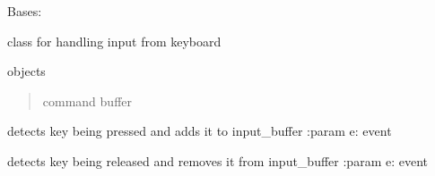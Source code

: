 \documentclass[letterpaper,10pt,english]{sphinxmanual}
\begin{document}
\begin{fulllineitems}
\label{\detokenize{InputHandler:InputHandler.InputHandler}}
\pysigstartsignatures
{}
\pysigstopsignatures
\sphinxAtStartPar
Bases: 

\sphinxAtStartPar
class for handling input from keyboard

\begin{fulllineitems}
\label{\detokenize{InputHandler:InputHandler.InputHandler.handle_input}}
\pysigstartsignatures
{}
\pysigstopsignatures\begin{description}
\sphinxAtStartPar
objects

\end{description}
\begin{quote}\begin{description}
\sphinxAtStartPar
command buffer

\end{description}\end{quote}

\end{fulllineitems}


\begin{fulllineitems}
\label{\detokenize{InputHandler:InputHandler.InputHandler.keydown}}
\pysigstartsignatures
{}
\pysigstopsignatures
\sphinxAtStartPar
detects key being pressed and adds it to input\_buffer
:param e: event

\end{fulllineitems}


\begin{fulllineitems}
\label{\detokenize{InputHandler:InputHandler.InputHandler.keyup}}
\pysigstartsignatures
{}
\pysigstopsignatures
\sphinxAtStartPar
detects key being released and removes it from input\_buffer
:param e: event

\end{fulllineitems}


\end{fulllineitems}
\end{document}
